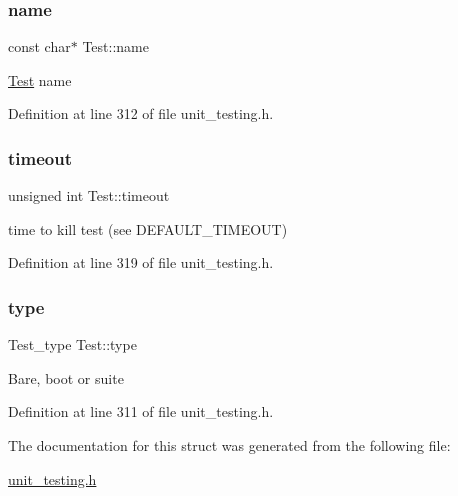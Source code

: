 \subsubsection{\texorpdfstring{name}{name}}
{\footnotesize\ttfamily const char$\ast$ Test\+::name}

\hyperlink{structTest}{Test} name 

Definition at line 312 of file unit\+\_\+testing.\+h.

\mbox{\label{structTest_a80e78f2e6aeed2a6e5b7c705ce5a1493}} 
\subsubsection{\texorpdfstring{timeout}{timeout}}
{\footnotesize\ttfamily unsigned int Test\+::timeout}

time to kill test (see D\+E\+F\+A\+U\+L\+T\+\_\+\+T\+I\+M\+E\+O\+UT) 

Definition at line 319 of file unit\+\_\+testing.\+h.

\mbox{\label{structTest_a5074007b777ea0958966027197c17792}} 
\subsubsection{\texorpdfstring{type}{type}}
{\footnotesize\ttfamily Test\+\_\+type Test\+::type}

Bare, boot or suite 

Definition at line 311 of file unit\+\_\+testing.\+h.



The documentation for this struct was generated from the following file\+:\begin{DoxyCompactItemize}
\item 
\hyperlink{unit__testing_8h}{unit\+\_\+testing.\+h}\end{DoxyCompactItemize}
